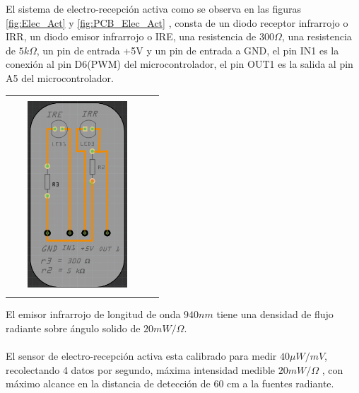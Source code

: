 \documentclass[12]{article}
\newenvironment{Figure}
{\par\medskip\noindent\minipage{\linewidth}}
{\endminipage\par\medskip}
\begin{document}
\begin{multicols}{2}
El sistema de electro-recepción activa como se observa en las figuras \ref{fig:Elec_Act} y \ref{fig:PCB_Elec_Act} , consta de un diodo receptor infrarrojo o IRR, un diodo emisor infrarrojo o IRE, una resistencia de $300\Omega$, una resistencia de $5 k\Omega$, un pin de entrada +5V y un pin de entrada a GND, el pin IN1 es la conexión al pin D6(PWM) del microcontrolador, el pin OUT1 es la salida al pin A5 del microcontrolador.
\begin{Figure}
\center
\begin{tabular}{|l|r|}
\hline
\\
\includegraphics[width=5cm, height=7cm]{img/H1.png}  \\\\ \hline
\end{tabular}
\label{fig:PCB_Elec_Act}
\end{Figure}
El emisor infrarrojo de longitud de onda $940 nm$ tiene una densidad de flujo radiante sobre  ángulo solido de $20 mW/\Omega$.\\\\
El sensor de electro-recepción activa esta calibrado para medir $40 \mu W/mV$, recolectando 4 datos por segundo, máxima intensidad medible $20 mW/\Omega$ , con máximo alcance en la distancia de detección de 60 cm a la fuentes radiante.

\end{multicols}
\end{document}

